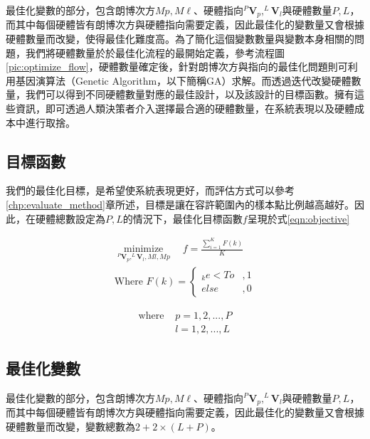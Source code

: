 最佳化變數的部分，包含朗博次方$Mp,M\ell$、硬體指向$^{P}\boldsymbol{V}_p,^{L}\boldsymbol{V}_l$與硬體數量$P,L$，而其中每個硬體皆有朗博次方與硬體指向需要定義，因此最佳化的變數量又會根據硬體數量而改變，使得最佳化難度高。為了簡化這個變數數量與變數本身相關的問題，我們將硬體數量於於最佳化流程的最開始定義，參考流程圖\ref{pic:optimize_flow}，硬體數量確定後，針對朗博次方與指向的最佳化問題則可利用基因演算法（Genetic Algorithm，以下簡稱GA）求解。而透過迭代改變硬體數量，我們可以得到不同硬體數量對應的最佳設計，以及該設計的目標函數。擁有這些資訊，即可透過人類決策者介入選擇最合適的硬體數量，在系統表現以及硬體成本中進行取捨。



    \subsection{目標函數}

    我們的最佳化目標，是希望使系統表現更好，而評估方式可以參考\ref{chp:evaluate_method}章所述，目標是讓在容許範圍內的樣本點比例越高越好。因此，在硬體總數設定為$P,L$的情況下，最佳化目標函數$f$呈現於式\ref{eqn:objective}

    \begin{equation}
        \label{eqn:objective}
        \begin{aligned}
        \underset{^{P}\boldsymbol{V}_p, ^{L}\boldsymbol{V}_l,Ml,Mp}{\operatorname{minimize}} 
        \quad f = 
        \frac{\sum_{i=1}^{K}F(k)}{K}  \\
        \text{Where }F(k)=
        \begin{cases}
            _{k}e<To&,1\\
            else&,0
        \end{cases}
        \end{aligned}
    \end{equation}

    \begin{align*} \text{where }
        &p=1,2,...,P\\&l=1,2,...,L
    \end{align*}


    \subsection{最佳化變數}

    最佳化變數的部分，包含朗博次方$Mp,M\ell$、硬體指向$^{P}\boldsymbol{V}_p,^{L}\boldsymbol{V}_l$與硬體數量$P,L$，而其中每個硬體皆有朗博次方與硬體指向需要定義，因此最佳化的變數量又會根據硬體數量而改變，變數總數為$2+2\times(L+P)$。


